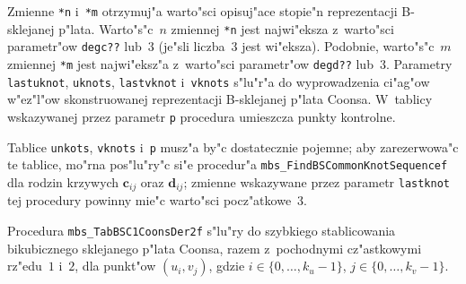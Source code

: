 Zmienne \texttt{*n} i~\texttt{*m} otrzymuj"a warto"sci opisuj"ace stopie"n
reprezentacji B-sklejanej p"lata. Warto"s"c~$n$ zmiennej \texttt{*n} jest
najwi"eksza z~warto"sci parametr"ow \texttt{degc??} lub~$3$ (je"sli liczba~$3$
jest wi"eksza). Podobnie, warto"s"c~$m$ zmiennej \texttt{*m} jest najwi"eksz"a
z~warto"sci parametr"ow \texttt{degd??} lub~$3$. Parametry
\texttt{lastuknot}, \texttt{uknots}, \texttt{lastvknot} i~\texttt{vknots}
s"lu"r"a do wyprowadzenia ci"ag"ow w"ez"l"ow skonstruowanej reprezentacji
B-sklejanej p"lata Coonsa. W~tablicy wskazywanej przez
parametr \texttt{p} procedura umieszcza punkty kontrolne.

Tablice \texttt{unkots}, \texttt{vknots} i~\texttt{p} musz"a by"c
dostatecznie pojemne; aby zarezerwowa"c te tablice, mo"rna pos"lu"ry"c si"e
procedur"a \texttt{mbs\_FindBSCommonKnotSequencef} dla rodzin krzywych
$\bm{c}_{ij}$ oraz $\bm{d}_{ij}$; zmienne wskazywane przez parametr
\texttt{lastknot} tej procedury powinny mie"c warto"sci pocz"atkowe~$3$.


\vspace{\bigskipamount}
Procedura \texttt{mbs\_TabBSC1CoonsDer2f} s"lu"ry do szybkiego stablicowania
bikubicznego sklejanego p"lata Coonsa, razem z~pochodnymi cz"astkowymi
rz"edu~$1$ i~$2$, dla punkt"ow $(u_i,v_j)$, gdzie $i\in\{0,\ldots,k_u-1\}$,
$j\in\{0,\ldots,k_v-1\}$.

